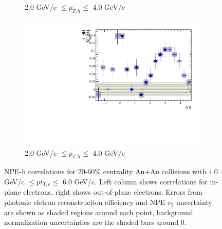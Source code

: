 \begin{figure}[htbp]
\begin{subfigure}{0.5\textwidth}
		\caption{2.0 GeV/c $\leq p_{T,h} \leq$ 4.0 GeV/c}
		\label{fig:EP_corr_subtracted_e}
	\end{subfigure}	
	\begin{subfigure}{0.5\textwidth}
		\includegraphics[width=.9\textwidth]{Plots/Correlations/EP/subtracted/NPE_subtracted_eh_corr_outplane_primpt_4_5_cent_2_5_assopt_3_4.pdf}
		\caption{2.0 GeV/c $\leq p_{T,h} \leq$ 4.0 GeV/c}
		\label{fig:EP_corr_subtracted_f}
	\end{subfigure}	
\caption[Subtracted NPE-hadron Correlations, In-plane and Out-of-plane]{NPE-h correlations for 20-60\% centrality Au+Au collisions with 4.0 GeV/c $\leq pt_{T,e} \leq$ 6.0 GeV/c. Left column shows correlations for in-plane electrons, right shows out-of-plane electrons. Errors from photonic eletron reconstruciton efficiency and NPE $v_2$ uncertainty are shown as shaded regions around each point, background normalization uncertainties are the shaded bars around 0.}
\label{fig:EP_corr_subtracted}
\end{figure}

